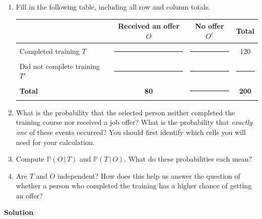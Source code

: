 \documentclass[11pt,letterpaper]{article}
\newcommand{\blocktitle}[1]{\par\addvspace{9pt}\noindent\textbf{#1}\par\nopagebreak\vspace{2pt}\nopagebreak}
\newcommand{\blank}{\rule{1.4em}{0.35pt}}
\begin{document}
\begin{enumerate}[label=\alph*.]

\item \begin{minipage}[t]{\linewidth}
Fill in the following table, including all row and column totals.
\begin{center}
\small
\begin{tabular}{|l|c|c|c|}
\hline
 & \textbf{Received an offer $O$} & \textbf{No offer $O^c$} & \textbf{Total} \\ \hline
Completed training $T$ & \blank & \blank & 120 \\ \hline
Did not complete training $T^c$ & \blank & \blank & \blank \\ \hline
\textbf{Total} & \textbf{80} & \blank & \textbf{200} \\ \hline
\end{tabular}
\end{center}
\end{minipage}

\item What is the probability that the selected person neither completed the training course nor received a job offer? What is the probability that \emph{exactly one} of these events occurred? You should first identify which cells you will need for your calculation.

\item Compute $\mathbb P(O \,|\, T)$ and $\mathbb P(T \,|\, O)$. What do these probabilities each mean?

\item Are $T$ and $O$ independent? How does this help us answer the question of whether a person who completed the training has a higher chance of getting an offer?

\end{enumerate}

\blocktitle{Solution}
\end{document}
